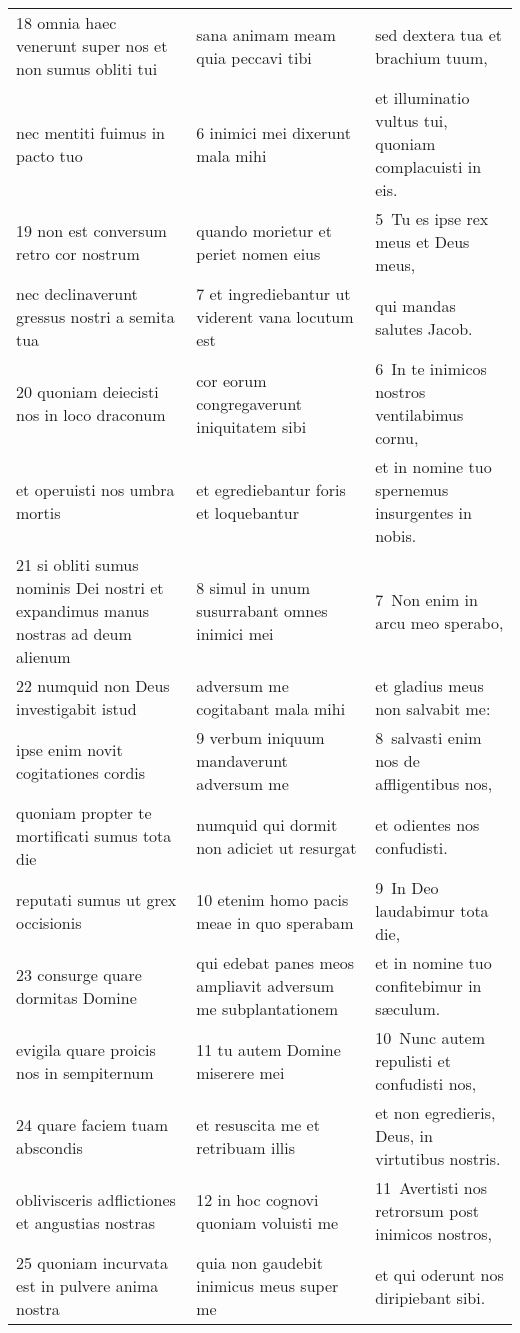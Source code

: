 \documentclass{article}
\begin{document}
\begin{longtable}{@{}p{}p{}p{}@{}}
18 omnia haec venerunt super nos et non sumus obliti tui	&	sana animam meam quia peccavi tibi	&	sed dextera tua et brachium tuum,	\\
nec mentiti fuimus in pacto tuo	&	6 inimici mei dixerunt mala mihi	&	et illuminatio vultus tui, quoniam complacuisti in eis.	\\
19 non est conversum retro cor nostrum	&	quando morietur et periet nomen eius	&	5 Tu es ipse rex meus et Deus meus,	\\
nec declinaverunt gressus nostri a semita tua	&	7 et ingrediebantur ut viderent vana locutum est	&	qui mandas salutes Jacob.	\\
20 quoniam deiecisti nos in loco draconum	&	cor eorum congregaverunt iniquitatem sibi	&	6 In te inimicos nostros ventilabimus cornu,	\\
et operuisti nos umbra mortis	&	et egrediebantur foris et loquebantur	&	et in nomine tuo spernemus insurgentes in nobis.	\\
21 si obliti sumus nominis Dei nostri et expandimus manus nostras ad deum alienum	&	8 simul in unum susurrabant omnes inimici mei	&	7 Non enim in arcu meo sperabo,	\\
22 numquid non Deus investigabit istud	&	adversum me cogitabant mala mihi	&	et gladius meus non salvabit me:	\\
ipse enim novit cogitationes cordis	&	9 verbum iniquum mandaverunt adversum me	&	8 salvasti enim nos de affligentibus nos,	\\
quoniam propter te mortificati sumus tota die	&	numquid qui dormit non adiciet ut resurgat	&	et odientes nos confudisti.	\\
reputati sumus ut grex occisionis	&	10 etenim homo pacis meae in quo sperabam	&	9 In Deo laudabimur tota die,	\\
23 consurge quare dormitas Domine	&	qui edebat panes meos ampliavit adversum me subplantationem	&	et in nomine tuo confitebimur in sæculum.	\\
evigila quare proicis nos in sempiternum	&	11 tu autem Domine miserere mei	&	10 Nunc autem repulisti et confudisti nos,	\\
24 quare faciem tuam abscondis	&	et resuscita me et retribuam illis	&	et non egredieris, Deus, in virtutibus nostris.	\\
oblivisceris adflictiones et angustias nostras	&	12 in hoc cognovi quoniam voluisti me	&	11 Avertisti nos retrorsum post inimicos nostros,	\\
25 quoniam incurvata est in pulvere anima nostra	&	quia non gaudebit inimicus meus super me	&	et qui oderunt nos diripiebant sibi.	\\

\end{longtable}
\end{document}
